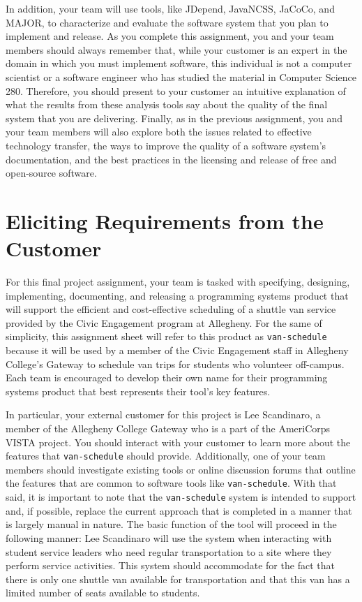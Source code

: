 In addition, your team will use tools, like JDepend, JavaNCSS, JaCoCo, and MAJOR, to characterize and evaluate the
software system that you plan to implement and release.  As you complete this assignment, you and your team members
should always remember that, while your customer is an expert in the domain in which you must implement software, this
individual is not a computer scientist or a software engineer who has studied the material in Computer Science 280.
Therefore, you should present to your customer an intuitive explanation of what the results from these analysis tools say
about the quality of the final system that you are delivering.  Finally, as in the previous assignment, you and your
team members will also explore both the issues related to effective technology transfer, the ways to improve the quality
of a software system's documentation, and the best practices in the licensing and release of free and open-source
software.

\section*{Eliciting Requirements from the Customer}

For this final project assignment, your team is tasked with specifying, designing, implementing, documenting, and
releasing a programming systems product that will support the efficient and cost-effective scheduling of a shuttle van
service provided by the Civic Engagement program at Allegheny.  For the same of simplicity, this assignment sheet will
refer to this product as {\tt van-schedule} because it will be used by a member of the Civic Engagement staff in
Allegheny College's Gateway to schedule van trips for students who volunteer off-campus. Each team is encouraged to
develop their own name for their programming systems product that best represents their tool's key features.


In particular, your external customer for this project is Lee Scandinaro, a member of the Allegheny College Gateway who
is a part of the AmeriCorps VISTA project. You should interact with your customer to learn more about the features that
{\tt van-schedule} should provide.  Additionally, one of your team members should investigate existing tools or online
discussion forums that outline the features that are common to software tools like {\tt van-schedule}. With that said,
it is important to note that the {\tt van-schedule} system is intended to support and, if possible, replace the current
approach that is completed in a manner that is largely manual in nature.  The basic function of the tool will proceed in
the following manner: Lee Scandinaro will use the system when interacting with student service leaders who need regular
transportation to a site where they perform service activities. This system should accommodate for the fact that there
is only one shuttle van available for transportation and that this van has a limited number of seats available to
students.

